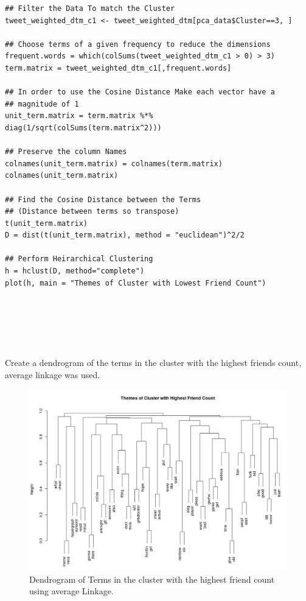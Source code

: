 \documentclass[11pt]{article}
\begin{document}
\begin{listing}[htbp]
\begin{verbatim}
## Filter the Data To match the Cluster
tweet_weighted_dtm_c1 <- tweet_weighted_dtm[pca_data$Cluster==3, ]

## Choose terms of a given frequency to reduce the dimensions
frequent.words = which(colSums(tweet_weighted_dtm_c1 > 0) > 3)
term.matrix = tweet_weighted_dtm_c1[,frequent.words]

## In order to use the Cosine Distance Make each vector have a
## magnitude of 1
unit_term.matrix = term.matrix %*% diag(1/sqrt(colSums(term.matrix^2)))

## Preserve the column Names
colnames(unit_term.matrix) = colnames(term.matrix)
colnames(unit_term.matrix)

## Find the Cosine Distance between the Terms
## (Distance between terms so transpose)
t(unit_term.matrix)
D = dist(t(unit_term.matrix), method = "euclidean")^2/2

## Perform Heirarchical Clustering
h = hclust(D, method="complete")
plot(h, main = "Themes of Cluster with Lowest Friend Count")






\end{verbatim}
\caption{\label{orgedf9cb3}Create a dendrogram of the terms in the cluster with the highest friends count, average linkage was used.}
\end{listing}


\begin{figure}[htbp]
\centering
\includegraphics[width=12cm]{./Figures/HighDend.png}
\caption{\label{fig:orgbe77405}Dendrogram of Terms in the cluster with the highest friend count using average Linkage.}
\end{figure}
\end{document}
